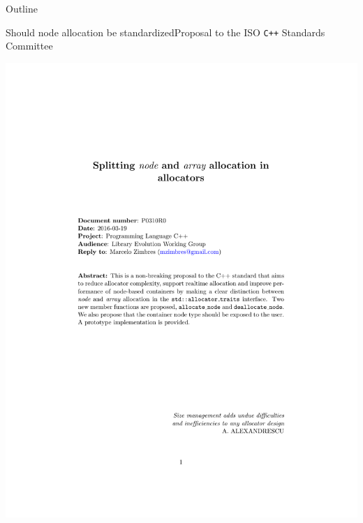 \documentclass[10pt,aspectratio=169]{beamer}
\begin{document}
\begin{frame}{Outline}
\end{frame}

\begin{frame}{Should node allocation be standardized}{Proposal to the ISO \texttt{C++} Standards Committee}
\vspace{-3cm}
    \begin{center}
        \includegraphics[scale=0.6]{fig/prop1.pdf} \\
    \end{center}
\end{frame}
\end{document}
